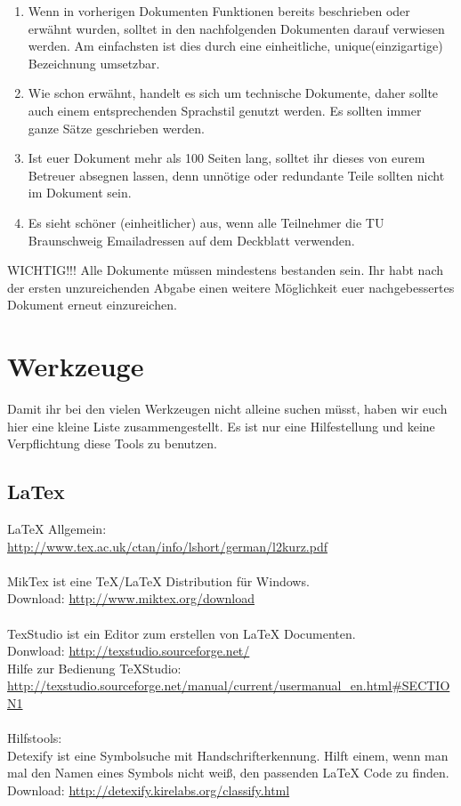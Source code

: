 \begin{enumerate}
\item Wenn in vorherigen Dokumenten Funktionen bereits beschrieben oder erwähnt wurden, solltet in den nachfolgenden Dokumenten darauf verwiesen werden. Am einfachsten ist dies durch eine einheitliche, unique(einzigartige) Bezeichnung umsetzbar.

\item Wie schon erwähnt, handelt es sich um technische Dokumente, daher sollte auch einem entsprechenden Sprachstil genutzt werden. Es sollten immer ganze Sätze geschrieben werden.

\item Ist euer Dokument mehr als 100 Seiten lang, solltet ihr dieses von eurem Betreuer absegnen lassen, denn unnötige oder redundante Teile sollten nicht im Dokument sein.

\item Es sieht schöner (einheitlicher) aus, wenn alle Teilnehmer die TU Braunschweig Emailadressen auf dem Deckblatt verwenden.

\end{enumerate}

WICHTIG!!! Alle Dokumente müssen mindestens bestanden sein. Ihr habt nach der ersten unzureichenden Abgabe einen weitere Möglichkeit euer nachgebessertes Dokument erneut einzureichen.


\chapter{Werkzeuge}

Damit ihr bei den vielen Werkzeugen nicht alleine suchen müsst, haben wir euch hier eine kleine Liste zusammengestellt.
Es ist nur eine Hilfestellung und keine Verpflichtung diese Tools zu benutzen. 

\section{LaTex}

LaTeX Allgemein: \\
\url{http://www.tex.ac.uk/ctan/info/lshort/german/l2kurz.pdf}\\
\\
MikTex ist eine TeX/LaTeX Distribution für Windows. \\
Download: \url{http://www.miktex.org/download} \\
\\
TexStudio ist ein Editor zum erstellen von LaTeX Documenten.\\
Donwload: \url{http://texstudio.sourceforge.net/} \\
Hilfe zur Bedienung TeXStudio:\\
\url{http://texstudio.sourceforge.net/manual/current/usermanual_en.html#SECTION1}\\
\\
Hilfstools:\\
Detexify ist eine Symbolsuche mit Handschrifterkennung. 
Hilft einem, wenn man mal den Namen eines Symbols nicht weiß, den passenden LaTeX Code zu finden.\\
Download: \url{http://detexify.kirelabs.org/classify.html}

